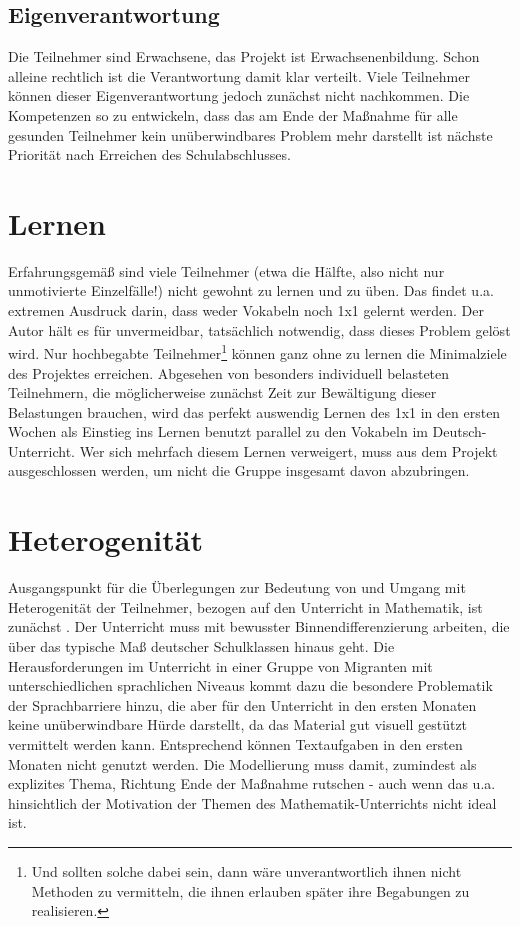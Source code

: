 \documentclass[a4paper]{book}%
\theoremstyle{definition}
\begin{document}
\section{Eigenverantwortung}\label{Konzept:Eigenverantwortung}

Die Teilnehmer sind Erwachsene, das Projekt ist Erwachsenenbildung. Schon alleine rechtlich ist die Verantwortung damit klar verteilt. Viele Teilnehmer können dieser Eigenverantwortung jedoch zunächst nicht nachkommen. Die Kompetenzen so zu entwickeln, dass das am Ende der Maßnahme für alle gesunden Teilnehmer kein unüberwindbares Problem mehr darstellt ist nächste Priorität nach Erreichen des Schulabschlusses.


\chapter{Lernen}

Erfahrungsgemäß sind viele Teilnehmer (etwa die Hälfte, also nicht nur unmotivierte Einzelfälle!) nicht gewohnt zu lernen und zu üben. Das findet u.a. extremen Ausdruck darin, dass weder Vokabeln noch 1x1 gelernt werden. Der Autor hält es für unvermeidbar, tatsächlich notwendig, dass dieses Problem gelöst wird. Nur hochbegabte Teilnehmer\footnote{Und sollten solche dabei sein, dann wäre unverantwortlich ihnen nicht Methoden zu vermitteln, die ihnen erlauben später ihre Begabungen zu realisieren.} können ganz ohne zu lernen die Minimalziele des Projektes erreichen. Abgesehen von besonders individuell belasteten Teilnehmern, die möglicherweise zunächst Zeit zur Bewältigung dieser Belastungen brauchen, wird das perfekt auswendig Lernen des 1x1 in den ersten Wochen als Einstieg ins Lernen benutzt parallel zu den Vokabeln im Deutsch-Unterricht. Wer sich mehrfach diesem Lernen verweigert, muss aus dem Projekt ausgeschlossen werden, um nicht die Gruppe insgesamt davon abzubringen.


\chapter{Heterogenität}

Ausgangspunkt für die Überlegungen zur Bedeutung von und Umgang mit Heterogenität der Teilnehmer, bezogen auf den Unterricht in Mathematik, ist zunächst \citep{Leiss2014}. Der Unterricht muss mit bewusster Binnendifferenzierung arbeiten, die über das typische Maß deutscher Schulklassen hinaus geht. Die Herausforderungen im Unterricht in einer Gruppe von Migranten mit unterschiedlichen sprachlichen Niveaus kommt dazu die besondere Problematik der Sprachbarriere hinzu, die aber für den Unterricht in den ersten Monaten keine unüberwindbare Hürde darstellt, da das Material gut visuell gestützt vermittelt werden kann. Entsprechend können Textaufgaben in den ersten Monaten nicht genutzt werden. Die Modellierung muss damit, zumindest als explizites Thema, Richtung Ende der Maßnahme rutschen - auch wenn das u.a. hinsichtlich der Motivation der Themen des Mathematik-Unterrichts nicht ideal ist.
\end{document}
